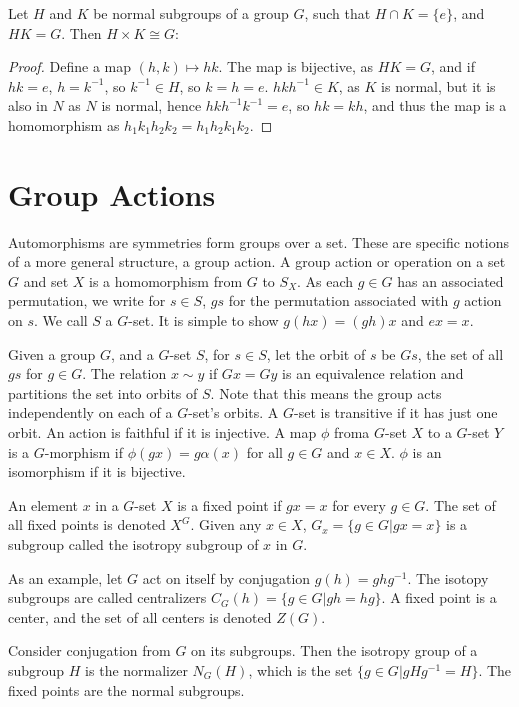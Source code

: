 \documentclass{report}
\begin{document}
Let $H$ and $K$ be normal subgroups of a group $G$, such that $H \cap K = \{ e \}$, and $HK = G$. Then $H \times K \cong G$:
\begin{proof}
    Define a map $(h,k) \mapsto hk$. The map is bijective, as $HK = G$, and if $hk = e$, $h = k^{-1}$, so $k^{-1} \in H$, so $k = h = e$. $hkh^{-1} \in K$, as $K$ is normal, but it is also in $N$ as $N$ is normal, hence $hkh^{-1}k^{-1} = e$, so $hk = kh$, and thus the map is a homomorphism as $h_1k_1h_2k_2 = h_1h_2k_1k_2$.
\end{proof}

\chapter{Group Actions}

Automorphisms are symmetries form groups over a set. These are specific notions of a more general structure, a group action. A group action or operation on a set $G$ and set $X$ is a homomorphism from $G$ to $S_X$. As each $g \in G$ has an associated permutation, we write for $s \in S$, $gs$ for the permutation associated with $g$ action on $s$. We call $S$ a $G$-set. It is simple to show $g(hx) = (gh)x$ and $ex = x$.

Given a group $G$, and a $G$-set $S$, for $s \in S$, let the orbit of $s$ be $Gs$, the set of all $gs$ for $g \in G$. The relation $x \sim y$ if $Gx = Gy$ is an equivalence relation and partitions the set into orbits of $S$. Note that this means the group acts independently on each of a $G$-set's orbits. A $G$-set is transitive if it has just one orbit. An action is faithful if it is injective. A map $\phi$ froma  $G$-set $X$ to a $G$-set $Y$ is a $G$-morphism if $\phi(gx) = g\alpha(x)$ for all $g \in G$ and $x \in X$. $\phi$ is an isomorphism if it is bijective.

An element $x$ in a $G$-set $X$ is a fixed point if $gx = x$ for every $g \in G$. The set of all fixed points is denoted $X^G$. Given any $x \in X$, $G_x = \{ g \in G | gx = x \}$ is a subgroup called the isotropy subgroup of $x$ in $G$.

As an example, let $G$ act on itself by conjugation $g(h) = ghg^{-1}$. The isotopy subgroups are called centralizers $C_G(h) = \{ g \in G | gh = hg \}$. A fixed point is a center, and the set of all centers is denoted $Z(G)$.

Consider conjugation from $G$ on its subgroups. Then the isotropy group of a subgroup $H$ is the normalizer $N_G(H)$, which is the set $\{ g \in G | gHg^{-1} = H \}$. The fixed points are the normal subgroups.
\end{document}
